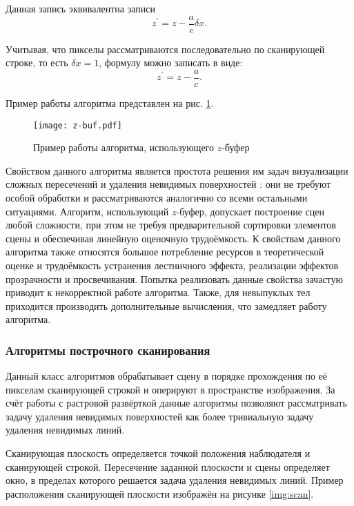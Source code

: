 Данная запись эквивалентна записи \begin{equation}
	z^{'} = z - \frac{a}{c}\delta x.
\end{equation}

Учитывая, что пикселы рассматриваются последовательно по сканирующей строке, то есть $\delta x = 1$, формулу можно записать в виде: \begin{equation}
	z^{'} = z - \frac{a}{c}.
\end{equation}

Пример работы алгоритма представлен на рис. \ref{img:z-buf}.

\begin{figure}[h!]
    \centering
    \texttt{[image: z-buf.pdf]}
    \caption{Пример работы алгоритма, использующего $z$-буфер}
    \label{img:z-buf}
\end{figure}

Свойством данного алгоритма является простота решения им задач визуализации сложных пересечений и удаления невидимых поверхностей \cite{item12}: они не требуют особой обработки и рассматриваются аналогично со всеми остальными ситуациями. Алгоритм, использующий $z$-буфер, допускает построение сцен любой сложности, при этом не требуя предварительной сортировки элементов сцены и обеспечивая линейную оценочную трудоёмкость. К свойствам данного алгоритма также относятся большое потребление ресурсов в теоретической оценке и трудоёмкость устранения лестничного эффекта, реализации эффектов прозрачности и просвечивания. Попытка реализовать данные свойства зачастую приводит к некорректной работе алгоритма. Также, для невыпуклых тел приходится производить дополнительные вычисления, что замедляет работу алгоритма.

\subsubsection{Алгоритмы построчного сканирования}
Данный класс алгоритмов обрабатывает сцену в порядке прохождения по её пикселам сканирующей строкой \cite{item12} и оперируют в пространстве изображения. За счёт работы с растровой развёрткой данные алгоритмы позволяют рассматривать задачу удаления невидимых поверхностей как более тривиальную задачу удаления невидимых линий. 

Сканирующая плоскость определяется точкой положения наблюдателя и сканирующей строкой. Пересечение заданной плоскости и сцены определяет окно, в пределах которого решается задача удаления невидимых линий. Пример расположения сканирующей плоскости изображён на рисунке \ref{img:scan}.

